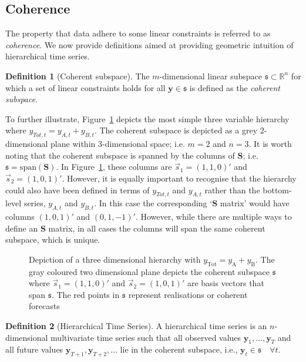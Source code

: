 \documentclass[12pt]{article}
\theoremstyle{definition}
\newtheorem{definition}{Definition}[section]
\begin{document}
\subsection{Coherence}\label{sec:cohpointf}

The property that data adhere to some linear constraints is referred to as \emph{coherence}. We now provide definitions aimed at providing geometric intuition of hierarchical time series.

\begin{definition}[Coherent subspace]\label{def:cohspace}
   The $m$-dimensional linear subspace $\mathfrak{s}\subset \mathbb{R}^n$ for which a set of linear constraints holds for all $\bm{y}\in\mathfrak{s}$ is defined as the \emph{coherent subspace}.
\end{definition}

To further illustrate, Figure~\ref{fig:3D_hierarchy} depicts the most simple three variable hierarchy where $y_{Tot,t}=y_{A,t}+y_{B,t}$. The coherent subspace is depicted as a grey $2$-dimensional plane within $3$-dimensional space; i.e. $m=2$ and $n=3$. It is worth noting that the coherent subspace is spanned by the columns of $\bm{S}$; i.e.\ $\mathfrak{s}=\text{span}(\bm{S})$. In Figure~\ref{fig:3D_hierarchy}, these columns are $\vec{s}_1=(1,1,0)'$ and $\vec{s}_2=(1,0,1)'$. However, it is equally important to recognise that the hierarchy could also have been defined in terms of $y_{Tot,t}$ and $y_{A,t}$ rather than the bottom-level series, $y_{A,t}$ and $y_{B,t}$. In this case the corresponding `$\bm{S}$ matrix' would have columns $(1,0,1)'$ and $(0,1,-1)'$. However, while there are multiple ways to define an $\bm{S}$ matrix, in all cases the columns will span the same coherent subspace, which is unique.

\begin{figure}[!hbt]
   \centering
   \vspace{-0.9cm}
     	\small
     	\resizebox{0.8\linewidth}{!}{
     		
     	}
     	\caption{Depiction of a three dimensional hierarchy with $y_{\text{Tot}} = y_{\text{A}} + y_{\text{B}}$. The gray coloured two dimensional plane depicts the coherent subspace $\mathfrak{s}$ where $\vec{s}_1 = (1,1,0)'$ and $\vec{s}_2 = (1, 0, 1)'$ are basis vectors that span $\mathfrak{s}$. The red points in $\mathfrak{s}$ represent realisations or coherent forecasts}\label{fig:3D_hierarchy}
     \end{figure}

	 \begin{definition}[Hierarchical Time Series]\label{def:cohspace}
   A hierarchical time series is an $n$-dimensional multivariate time series such that all observed values $\bm{y}_1,\ldots,\bm{y}_T$ and all future values $\bm{y}_{T+1},\bm{y}_{T+2},\ldots$ lie in the coherent subspace, i.e., $\bm{y}_t\in\mathfrak{s}\quad\forall t$.
\end{definition}
\end{document}
